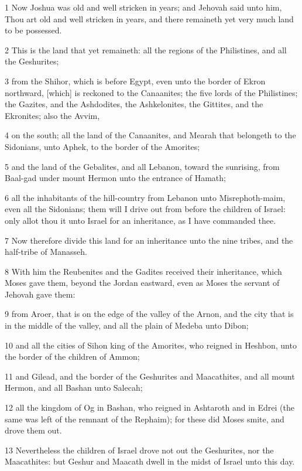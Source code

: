 \par 1 Now Joshua was old and well stricken in years; and Jehovah said unto him, Thou art old and well stricken in years, and there remaineth yet very much land to be possessed.
\par 2 This is the land that yet remaineth: all the regions of the Philistines, and all the Geshurites;
\par 3 from the Shihor, which is before Egypt, even unto the border of Ekron northward, [which] is reckoned to the Canaanites; the five lords of the Philistines; the Gazites, and the Ashdodites, the Ashkelonites, the Gittites, and the Ekronites; also the Avvim,
\par 4 on the south; all the land of the Canaanites, and Mearah that belongeth to the Sidonians, unto Aphek, to the border of the Amorites;
\par 5 and the land of the Gebalites, and all Lebanon, toward the sunrising, from Baal-gad under mount Hermon unto the entrance of Hamath;
\par 6 all the inhabitants of the hill-country from Lebanon unto Misrephoth-maim, even all the Sidonians; them will I drive out from before the children of Israel: only allot thou it unto Israel for an inheritance, as I have commanded thee.
\par 7 Now therefore divide this land for an inheritance unto the nine tribes, and the half-tribe of Manasseh.
\par 8 With him the Reubenites and the Gadites received their inheritance, which Moses gave them, beyond the Jordan eastward, even as Moses the servant of Jehovah gave them:
\par 9 from Aroer, that is on the edge of the valley of the Arnon, and the city that is in the middle of the valley, and all the plain of Medeba unto Dibon;
\par 10 and all the cities of Sihon king of the Amorites, who reigned in Heshbon, unto the border of the children of Ammon;
\par 11 and Gilead, and the border of the Geshurites and Maacathites, and all mount Hermon, and all Bashan unto Salecah;
\par 12 all the kingdom of Og in Bashan, who reigned in Ashtaroth and in Edrei (the same was left of the remnant of the Rephaim); for these did Moses smite, and drove them out.
\par 13 Nevertheless the children of Israel drove not out the Geshurites, nor the Maacathites: but Geshur and Maacath dwell in the midst of Israel unto this day.
